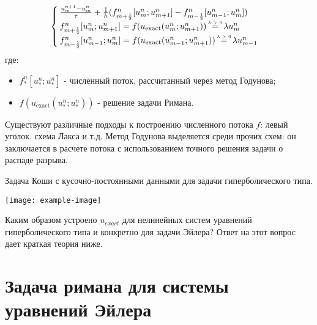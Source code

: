 \begin{equation}
	\begin{cases}
		\frac{u^{n+1}_{m} - u^{n}_{m}}{\tau} + \frac{1}{h} (f^{n}_{m+\frac{1}{2}}[u^{n}_{m}; u^{n}_{m+1}] - f^{n}_{m-\frac{1}{2}}[u^{n}_{m-1}; u^{n}_{m}])\\
		f^{n}_{m+\frac{1}{2}}[u^{n}_{m}; u^{n}_{m+1}] = f(u_{\text{exact}}(u^{n}_{m}; u^{n}_{m+1})) \ \lameq \ \lambda u^{n}_{m}\\
		f^{n}_{m-\frac{1}{2}}[u^{n}_{m-1}; u^{n}_{m}] = f(u_{\text{exact}}(u^{n}_{m-1}; u^{n}_{m+1})) \ \lameq \ \lambda u^{n}_{m-1}\\
	\end{cases}
\end{equation}
где:
\begin{itemize}
	\item $f^{n}_{*}[u^{n}_{*}; u^{n}_{*}]$ - численный поток, рассчитанный через метод Годунова;
	\item $f(u_{\text{exact}}(u^{n}_{*}; u^{n}_{*}))$ - решение задачи Римана.
\end{itemize}

Существуют различные подходы к построению численного потока $f$: левый уголок. схема Лакса и т.д. Метод Годунова выделяется среди прочих схем: он заключается в расчете потока с использованием точного решения задачи о распаде разрыва.

\begin{definition}
	Задача Коши с кусочно-постоянными данными для задачи гиперболического типа.
\end{definition}

\begin{example}
	
	\texttt{[image: example-image]}
\end{example}

Каким образом устроено $u_{exact}$ для нелинейных систем уравнений гиперболического типа и конкретно для задачи Эйлера? Ответ на этот вопрос дает краткая теория ниже.

\section{Задача римана для системы уравнений Эйлера}\label{sect_EulerRiemann}

